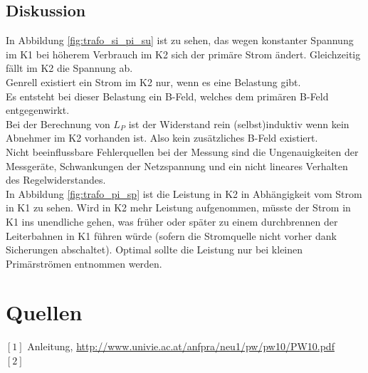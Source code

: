 \documentclass[12pt,a4paper]{article}
\begin{document}
\begin{multicols}{2}

\subsection{Diskussion}

In Abbildung \ref{fig:trafo_si_pi_su} ist zu sehen, das wegen konstanter Spannung im K1 bei höherem Verbrauch im K2 sich der primäre Strom ändert. Gleichzeitig fällt im K2 die Spannung ab.\\
Genrell existiert ein Strom im K2 nur, wenn es eine Belastung gibt.\\
Es entsteht bei dieser Belastung ein B-Feld, welches dem primären B-Feld entgegenwirkt.\\
Bei der Berechnung von $L_P$ ist der Widerstand rein (selbst)induktiv wenn kein Abnehmer im K2 vorhanden ist. Also kein zusätzliches B-Feld existiert.\\
Nicht beeinflussbare Fehlerquellen bei der Messung sind die Ungenauigkeiten der Messgeräte, Schwankungen der Netzspannung und ein nicht lineares Verhalten des Regelwiderstandes. \\
In Abbildung \ref{fig:trafo_pi_sp} ist die Leistung in K2 in Abhängigkeit vom Strom in K1 zu sehen. Wird in K2 mehr Leistung aufgenommen, müsste der Strom in K1  ins unendliche gehen, was früher oder später zu einem durchbrennen der Leiterbahnen in K1 führen würde (sofern die Stromquelle nicht vorher dank Sicherungen abschaltet). Optimal sollte die Leistung nur bei kleinen Primärströmen entnommen werden.\\





\section{Quellen}
$[1]$ Anleitung, \url{http://www.univie.ac.at/anfpra/neu1/pw/pw10/PW10.pdf}\\
$[2]$ 
\end{multicols}
\end{document}
